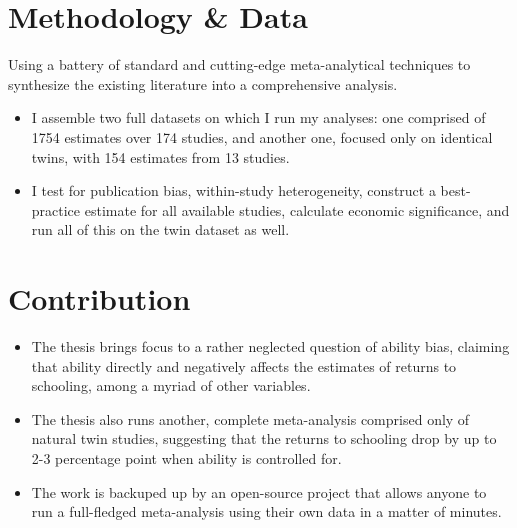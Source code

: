 \documentclass[12pt]{article}
\begin{document}
\section*{Methodology \& Data}

Using a battery of standard and cutting-edge meta-analytical techniques to synthesize the existing literature into a comprehensive analysis.

\begin{itemize}
    \item I assemble two full datasets on which I run my analyses: one comprised of 1754 estimates over 174 studies, and another one, focused only on identical twins, with 154 estimates from 13 studies.
    \item I test for publication bias, within-study heterogeneity, construct a best-practice estimate for all available studies, calculate economic significance, and run all of this on the twin dataset as well.
\end{itemize}

\section*{Contribution}

\begin{itemize}
    \item The thesis brings focus to a rather neglected question of ability bias, claiming that ability directly and negatively affects the estimates of returns to schooling, among a myriad of other variables.
    \item The thesis also runs another, complete meta-analysis comprised only of natural twin studies, suggesting that the returns to schooling drop by up to 2-3 percentage point when ability is controlled for.
    \item The work is backuped up by an open-source project that allows anyone to run a full-fledged meta-analysis using their own data in a matter of minutes.

\end{itemize}
\end{document}

